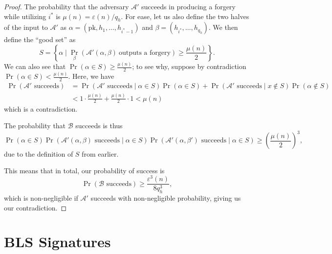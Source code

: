 \begin{proof}
    The probability that the adversary $\mathcal{A}'$ succeeds in producing a forgery while utilizing $i^*$ is $\mu(n) = \varepsilon(n) / q_h$. For ease, let us also define the two halves of the input to $\mathcal{A}'$ as $\alpha = (\mathrm{pk}, h_1, \ldots, h_{i^* - 1})$ and $\beta = (h_{i^*}, \ldots, h_{q_h})$. We then define the ``good set'' as
    \[
        S = \left\{\alpha \mid \Pr_{\beta}(\mathcal{A}'(\alpha, \beta)\ \text{outputs a forgery}) \ge \frac{\mu(n)}{2}\right\}
    .\]
    We can also see that $\Pr(\alpha \in S) \ge \frac{\mu(n)}{2}$; to see why, suppose by contradiction $\Pr(\alpha \in S) < \frac{\mu(n)}{2}$. Here, we have
    \begin{align*}
        \Pr(\text{$\mathcal{A}'$ succeeds}) &= \Pr(\text{$\mathcal{A}'$ succeeds} \mid \alpha \in S) \Pr(\alpha \in S) + \Pr(\text{$\mathcal{A}'$ succeeds} \mid x \notin S) \Pr(\alpha \notin S) \\
                                            &< 1 \cdot \frac{\mu(n)}{2} + \frac{\mu(n)}{2} \cdot 1 < \mu(n)
    \end{align*}
    which is a contradiction.

    The probability that $\mathcal{B}$ succeeds is thus
    \[
        \Pr(\alpha \in S) \Pr(\text{$\mathcal{A}'(\alpha, \beta)$ succeeds} \mid \alpha \in S) \Pr(\text{$\mathcal{A}'(\alpha, \beta')$ succeeds} \mid \alpha \in S)
        \ge \left(\frac{\mu(n)}{2}\right)^3
    ,\]
    due to the definition of $S$ from earlier.

    This means that in total, our probability of success is
    \[
        \Pr(\text{$\mathcal{B}$ succeeds}) \ge \frac{\varepsilon^3(n)}{8q_h^3}
    ,\]
    which is non-negligible if $\mathcal{A}'$ succeeds with non-negligible probability, giving us our contradiction.
\end{proof}




\section{BLS Signatures}

